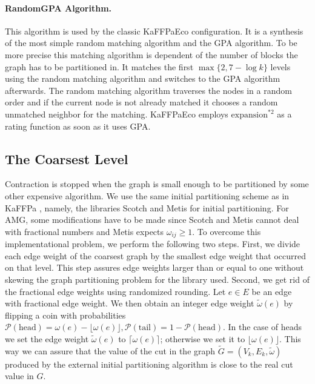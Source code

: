\documentclass{llncs}
\newcommand{\expansion}{\mathrm{expansion}}
\begin{document}
\paragraph{RandomGPA Algorithm.}
This algorithm is used by the classic KaFFPaEco configuration. 
It is a synthesis of the most simple random matching algorithm and the GPA algorithm. 
To be more precise this matching algorithm is dependent of the number of blocks the graph has to be partitioned in. 
It matches the first $\max\{2, 7-\log k\}$ levels using the random matching algorithm and switches to the GPA algorithm afterwards. 
The random matching algorithm traverses the nodes in a random order and if the current node is not already matched it chooses a random unmatched neighbor for the matching.
KaFFPaEco employs $\expansion^{*2}$ as a rating function as soon as it uses GPA.
\subsection{The Coarsest Level}
Contraction is stopped when the graph is small enough to be partitioned by some other expensive algorithm. We use the same initial partitioning scheme as in KaFFPa \cite{kaffpa}, namely, the libraries Scotch and Metis for initial partitioning.
For AMG, some modifications have to be made since Scotch and Metis cannot deal with fractional numbers and Metis expects $\omega_{ij}\geq 1$. 
To overcome this implementational problem, we perform the following two steps. 
First, we divide each edge weight of the coarsest graph by the smallest edge weight that occurred on that level. 
This step assures edge weights larger than or equal to one without skewing the graph partitioning problem for the library used. 
Second, we get rid of the fractional edge weights using randomized rounding. Let $e \in E$ be an edge with fractional edge weight. We then obtain an integer edge weight $\tilde \omega (e)$  by flipping a coin with probabilities $\mathcal{P}(\text{head})= \omega(e)- \lfloor \omega(e) \rfloor,  \mathcal{P}(\text{tail}) = 1 - \mathcal{P}(\text{head})$. 
In the case of heads we set the edge weight $\tilde \omega(e)$ to $\lceil \omega(e) \rceil$; otherwise we set it to $\lfloor \omega(e) \rfloor$. This way we can assure that the value of the cut in the graph $\tilde G = (V_k, E_k, \tilde \omega)$ produced by the external initial partitioning algorithm is close to the real cut value in $G$. 
\end{document}
